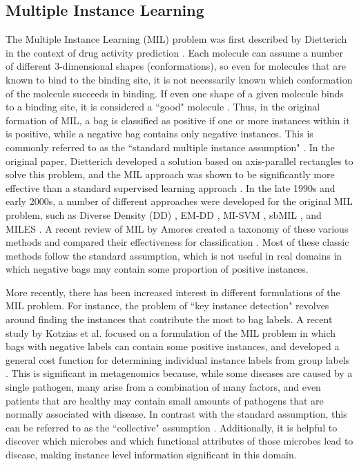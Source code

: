 
\subsection{Multiple Instance Learning}

The Multiple Instance Learning (MIL) problem was first described by Dietterich in the context of drug activity prediction \cite{dietterich97}. 
Each molecule can assume a number of different 3-dimensional shapes (conformations), so even for molecules that are known to bind to the binding site, it is not necessarily known which conformation of the molecule succeeds in binding. If even one shape of a given molecule binds to a binding site, it is considered a ``good" molecule \cite{dietterich97}. Thus, in the original formation of MIL, a bag is classified as positive if one or more instances within it is positive, while a negative bag contains only negative instances. This is commonly referred to as the ``standard multiple instance assumption" \cite{amores13}. In the original paper, Dietterich developed a solution based on axis-parallel rectangles to solve this problem, and the MIL approach was shown to be significantly more effective than a standard supervised learning approach \cite{dietterich97}. In the late 1990s and early 2000s, a number of different approaches were developed for the original MIL problem, such as Diverse Density (DD) \cite{perez98}, EM-DD \cite{zhang01}, MI-SVM \cite{andrews02}, sbMIL \cite{bunescu07}, and MILES \cite{wang06}. A recent review of MIL by Amores created a taxonomy of these various methods and compared their effectiveness for classification \cite{amores13}. Most of these classic methods follow the standard assumption, which is not useful in real domains in which negative bags may contain some proportion of positive instances.
%

More recently, there has been increased interest in different formulations of the MIL problem. For instance, the problem of ``key instance detection" \cite{zhou12} revolves around finding the instances that contribute the most to bag labels. A recent study by Kotzias et al. focused on a formulation of the MIL problem in which bags with negative labels can contain some positive instances, and developed a general cost function for determining individual instance labels from group labels \cite{kotzias15}. This is significant in metagenomics because, while some diseases are caused by a single pathogen, many arise from a combination of many factors, and even patients that are healthy may contain small amounts of pathogens that are normally associated with disease. In contrast with the standard assumption, this can be referred to as the ``collective" assumption \cite{amores13}. Additionally, it is helpful to discover which microbes and which functional attributes of those microbes lead to disease, making instance level information significant in this domain.
%

